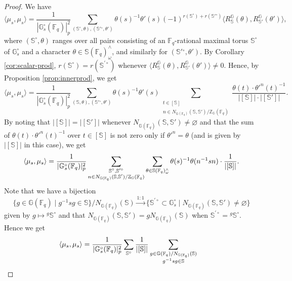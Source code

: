 \documentclass{amsart}
\newcommand{\F}{\mathbb{F}}
\newcommand{\FF}{\mathbb{F}}
\newcommand{\bbS}{\mathbb{S}}
\newcommand{\bbG}{\mathbb{G}}
\newcommand{\bbZ}{\mathbb{Z}}
\theoremstyle{plain}
\theoremstyle{definition}
\theoremstyle{remark}
\theoremstyle{theorem}
\begin{document}
\begin{proof}
    We have
    \begin{equation*}
        \langle \mu_s, \mu_s \rangle 
        = \frac{1}{|\bbG_s^\circ(\FF_q)|_p^2} \sum_{(\bbS^\circ,\theta), (\bbS'{}^\circ,\theta')} \theta(s)^{-1} \theta'(s) (-1)^{r(\bbS^\circ) + r(\bbS'{}^\circ)} \langle R_{\bbS}^{\bbG}(\theta), R_{\bbS'}^{\bbG}(\theta') \rangle,
    \end{equation*}
    where $(\bbS^\circ,\theta)$ ranges over all pairs consisting of an $\F_{q}$-rational maximal torus $\bbS^\circ$ of $\bbG_s^\circ$ and a character $\theta \in \bbS(\FF_q)^\wedge_\omega$, and similarly for $(\bbS'{}^\circ, \theta')$. 
By Corollary \ref{cor:scalar-prod}, $r(\bbS^\circ)=r(\bbS^{\prime\circ})$ whenever $\langle R_{\bbS}^{\bbG}(\theta), R_{\bbS'}^{\bbG}(\theta') \rangle\neq0$.
Hence, by Proposition \ref{prop:innerprod}, we get
\[
\langle \mu_s, \mu_s \rangle 
=
\frac{1}{|\bbG_s^\circ(\FF_q)|_p^2} \sum_{(\bbS, \theta), (\bbS'{}^\circ,\theta')} \theta(s)^{-1} \theta'(s) \sum_{\substack{t \in [\bbS] \\ n \in N_{\bbG(\FF_q)}(\bbS,\bbS')/\bbZ_{\bbG}(\FF_q)}} \frac{\theta(t) \cdot \theta'^{n}(t)^{-1}}{|[\bbS]| \cdot |[\bbS']|}.
\]
By noting that $|[\bbS]|=|[\bbS']|$ whenever $N_{\bbG(\FF_q)}(\bbS,\bbS')\neq\varnothing$ and that the sum of $\theta(t) \cdot \theta'^{n}(t)^{-1}$ over $t\in[\bbS]$ is not zero only if $\theta'^{n}=\theta$ (and is given by $|[\bbS]|$ in this case), we get
\[
\langle \mu_s, \mu_s \rangle 
=
\frac{1}{|\bbG_s^\circ(\FF_q)|_p^2}
\sum_{\begin{subarray}{c}\bbS^{\circ},\bbS^{\prime\circ} \\ n\in N_{\bbG(\F_{q})}(\bbS,\bbS')/\bbZ_{\bbG}(\F_{q}) \end{subarray}}
\sum_{\theta\in\bbS(\FF_q)^\wedge_\omega}
\theta(s)^{-1}\theta(n^{-1}sn)\cdot\frac{1}{|[\bbS]|}.
\]
Note that we have a bijection
\[
\{g\in\bbG(\F_{q}) \mid g^{-1}sg\in\bbS\}/N_{\bbG(\F_{q})}(\bbS)
\xrightarrow{1:1}
\{\bbS^{\prime\circ}\subset\bbG_{s}^{\circ} \mid N_{\bbG(\F_{q})}(\bbS,\bbS')\neq\varnothing\}
\]
given by $g\mapsto {}^{g}\bbS^{\circ}$ and that $N_{\bbG(\F_{q})}(\bbS,\bbS')=gN_{\bbG(\F_{q})}(\bbS)$ when $\bbS^{\prime\circ}={}^{g}\bbS^{\circ}$.
Hence we get
\begin{align}
\nonumber
\langle \mu_s, \mu_s \rangle
&=\frac{1}{|\bbG_s^\circ(\FF_q)|_p^2}
\sum_{\bbS^{\circ}} \frac{1}{|[\bbS]|}
\sum_{\begin{subarray}{c}g\in \bbG(\F_{q})/N_{\bbG(\F_{q})}(\bbS) \\ g^{-1}sg\in \bbS\end{subarray}}

\end{align}
\end{proof}
\end{document}
